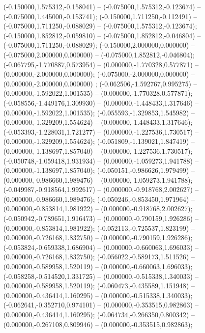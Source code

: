  (-0.150000,1.575312,-0.158041) -- (-0.075000,1.575312,-0.123674) -- (-0.075000,1.445000,-0.153741);
 (-0.150000,1.711250,-0.112491) -- (-0.075000,1.711250,-0.088029) -- (-0.075000,1.575312,-0.123674);
 (-0.150000,1.852812,-0.059810) -- (-0.075000,1.852812,-0.046804) -- (-0.075000,1.711250,-0.088029);
 (-0.150000,2.000000,0.000000) -- (-0.075000,2.000000,0.000000) -- (-0.075000,1.852812,-0.046804);
 (-0.067795,-1.770887,0.573954) -- (0.000000,-1.770328,0.577871) -- (0.000000,-2.000000,0.000000);
 (-0.075000,-2.000000,0.000000) -- (0.000000,-2.000000,0.000000) ;
 (-0.062506,-1.592767,0.995275) -- (0.000000,-1.592022,1.001535) -- (0.000000,-1.770328,0.577871);
 (-0.058556,-1.449176,1.309930) -- (0.000000,-1.448433,1.317646) -- (0.000000,-1.592022,1.001535);
 (-0.055593,-1.329853,1.545982) -- (0.000000,-1.329209,1.554624) -- (0.000000,-1.448433,1.317646);
 (-0.053393,-1.228031,1.721277) -- (0.000000,-1.227536,1.730517) -- (0.000000,-1.329209,1.554624);
 (-0.051809,-1.139021,1.847419) -- (0.000000,-1.138697,1.857040) -- (0.000000,-1.227536,1.730517);
 (-0.050748,-1.059418,1.931934) -- (0.000000,-1.059273,1.941788) -- (0.000000,-1.138697,1.857040);
 (-0.050151,-0.986626,1.979499) -- (0.000000,-0.986660,1.989476) -- (0.000000,-1.059273,1.941788);
 (-0.049987,-0.918564,1.992617) -- (0.000000,-0.918768,2.002627) -- (0.000000,-0.986660,1.989476);
 (-0.050246,-0.853450,1.971964) -- (0.000000,-0.853814,1.981922) -- (0.000000,-0.918768,2.002627);
 (-0.050942,-0.789651,1.916473) -- (0.000000,-0.790159,1.926286) -- (0.000000,-0.853814,1.981922);
 (-0.052113,-0.725537,1.823199) -- (0.000000,-0.726168,1.832750) -- (0.000000,-0.790159,1.926286);
 (-0.053824,-0.659338,1.686904) -- (0.000000,-0.660063,1.696033) -- (0.000000,-0.726168,1.832750);
 (-0.056022,-0.589173,1.511526) -- (0.000000,-0.589958,1.520119) -- (0.000000,-0.660063,1.696033);
 (-0.058258,-0.514520,1.331725) -- (0.000000,-0.515338,1.340033) -- (0.000000,-0.589958,1.520119);
 (-0.060473,-0.435589,1.151948) -- (0.000000,-0.436414,1.160295) -- (0.000000,-0.515338,1.340033);
 (-0.062641,-0.352710,0.974101) -- (0.000000,-0.353515,0.982863) -- (0.000000,-0.436414,1.160295);
 (-0.064734,-0.266350,0.800342) -- (0.000000,-0.267108,0.809946) -- (0.000000,-0.353515,0.982863);
